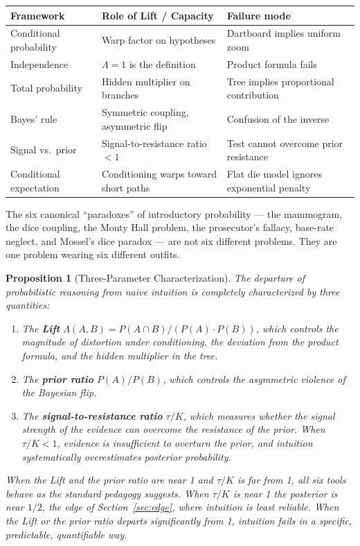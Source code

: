 \documentclass[12pt]{article}
\newtheorem{proposition}[theorem]{Proposition}
\begin{document}
\begin{table}[h!]
\centering
\small
\begin{tabular}{@{}p{3.2cm}p{4cm}p{5.5cm}@{}}
\toprule
\textbf{Framework} & \textbf{Role of Lift / Capacity} & \textbf{Failure mode} \\
\midrule
Conditional probability & Warp factor on hypotheses & Dartboard implies uniform zoom \\
Independence & $\Lambda = 1$ is the definition & Product formula fails \\
Total probability & Hidden multiplier on branches & Tree implies proportional contribution \\
Bayes' rule & Symmetric coupling, asymmetric flip & Confusion of the inverse \\
Signal vs.\ prior & Signal-to-resistance ratio $< 1$ & Test cannot overcome prior resistance \\
Conditional expectation & Conditioning warps toward short paths & Flat die model ignores exponential penalty \\
\bottomrule
\end{tabular}
\end{table}

The six canonical ``paradoxes'' of introductory probability --- the mammogram, the dice coupling, the Monty Hall problem, the prosecutor's fallacy, base-rate neglect, and Mossel's dice paradox --- are not six different problems. They are one problem wearing six different outfits.

\begin{proposition}[Three-Parameter Characterization]
The departure of probabilistic reasoning from naive intuition is completely characterized by three quantities:
\begin{enumerate}[nosep]
\item The \textbf{Lift} $\Lambda(A,B) = P(A \cap B) / (P(A) \cdot P(B))$, which controls the magnitude of distortion under conditioning, the deviation from the product formula, and the hidden multiplier in the tree.
\item The \textbf{prior ratio} $P(A)/P(B)$, which controls the asymmetric violence of the Bayesian flip.
\item The \textbf{signal-to-resistance ratio} $\tau/K$, which measures whether the signal strength of the evidence can overcome the resistance of the prior. When $\tau/K < 1$, evidence is insufficient to overturn the prior, and intuition systematically overestimates posterior probability.
\end{enumerate}
When the Lift and the prior ratio are near 1 and $\tau/K$ is far from 1, all six tools behave as the standard pedagogy suggests. When $\tau/K$ is near 1 the posterior is near $1/2$, the edge of Section~\ref{sec:edge}, where intuition is least reliable. When the Lift or the prior ratio departs significantly from 1, intuition fails in a specific, predictable, quantifiable way.
\end{proposition}
\end{document}
